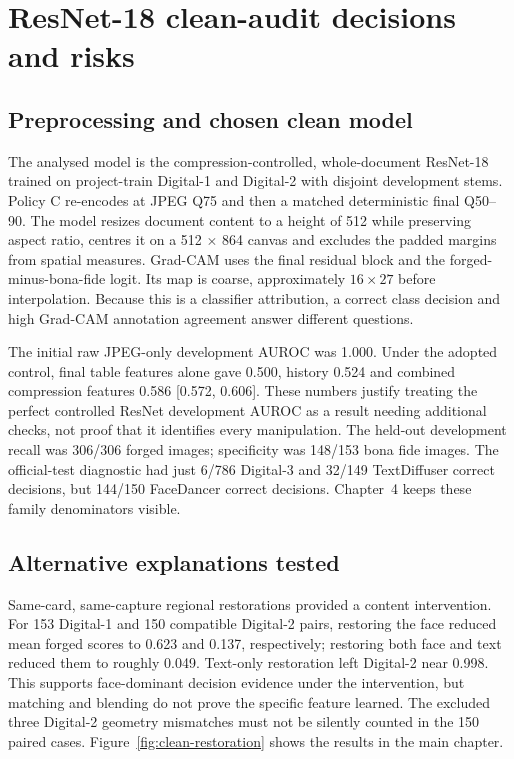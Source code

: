 
\chapter{ResNet-18 clean-audit decisions and risks}
\label{app:clean-resnet}

\section{Preprocessing and chosen clean model}

The analysed model is the compression-controlled, whole-document ResNet-18 trained on project-train Digital-1 and Digital-2 with disjoint development stems. Policy C re-encodes at JPEG Q75 and then a matched deterministic final Q50--90. The model resizes document content to a height of 512 while preserving aspect ratio, centres it on a 512 $\times$ 864 canvas and excludes the padded margins from spatial measures. Grad-CAM uses the final residual block and the forged-minus-bona-fide logit. Its map is coarse, approximately $16\times27$ before interpolation. Because this is a classifier attribution, a correct class decision and high Grad-CAM annotation agreement answer different questions.

The initial raw JPEG-only development AUROC was 1.000. Under the adopted control, final table features alone gave 0.500, history 0.524 and combined compression features 0.586 [0.572, 0.606]. These numbers justify treating the perfect controlled ResNet development AUROC as a result needing additional checks, not proof that it identifies every manipulation. The held-out development recall was 306/306 forged images; specificity was 148/153 bona fide images. The official-test diagnostic had just 6/786 Digital-3 and 32/149 TextDiffuser correct decisions, but 144/150 FaceDancer correct decisions. Chapter~4 keeps these family denominators visible.

\section{Alternative explanations tested}

Same-card, same-capture regional restorations provided a content intervention. For 153 Digital-1 and 150 compatible Digital-2 pairs, restoring the face reduced mean forged scores to 0.623 and 0.137, respectively; restoring both face and text reduced them to roughly 0.049. Text-only restoration left Digital-2 near 0.998. This supports face-dominant decision evidence under the intervention, but matching and blending do not prove the specific feature learned. The excluded three Digital-2 geometry mismatches must not be silently counted in the 150 paired cases. Figure~\ref{fig:clean-restoration} shows the results in the main chapter.

